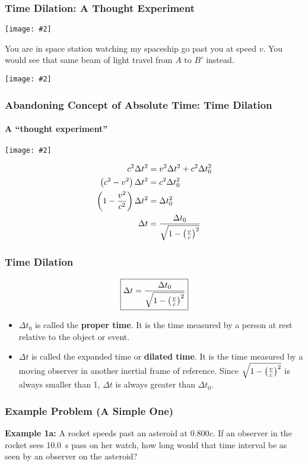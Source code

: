 \documentclass[12pt,compress,aspectratio=169]{beamer}
\newcommand{\pic}[2]{\texttt{[image: \#2]}}
\newcommand{\bigsqrt}{\ensuremath\sqrt{1-\left(\frac{v}{c}\right)^2}}
\begin{document}
\begin{frame}
  \frametitle{Time Dilation: A Thought Experiment}
  \begin{center}
    \pic{.7}{light-a-b-rocket.png}
  \end{center}
  You are in space station watching my spaceship go past you at speed $v$. You
  would see that same beam of light travel from $A$ to $B'$ instead.
  \begin{center}
    \pic{.7}{light-a-b-prime.png}
  \end{center}
\end{frame}

\begin{frame}
  \frametitle{Abandoning Concept of Absolute Time: Time Dilation}
  \framesubtitle{A ``thought experiment''}
  \begin{center}
    \pic{.7}{dilation.png}
  \end{center}
  \begin{align*}
    c^2\Delta t^2 &=v^2\Delta t^2 + c^2\Delta t_0^2\\
    \left(c^2-v^2\right)\Delta t^2 &=c^2\Delta t_0^2\\
    \left(1-\frac{v^2}{c^2}\right)\Delta t^2 &=\Delta t_0^2\\
    \Delta t &=\frac{\Delta t_0}{\bigsqrt}
  \end{align*}
\end{frame}


\begin{frame}
  \frametitle{Time Dilation}
  {\Large
    \begin{displaymath}
      \boxed{\Delta t =\frac{\Delta t_0}{\bigsqrt}}
    \end{displaymath}
  }
  \begin{itemize}
  \item $\Delta t_0$ is called the \textbf{proper time}. It is the time measured
    by a person at rest relative to the object or event.
  \item $\Delta t$ is called the expanded time or \textbf{dilated time}. It is 
    the time measured by a moving observer in another inertial frame of
    reference. Since $\bigsqrt$ is always smaller than 1, $\Delta t$ is always
    greater than $\Delta t_0$.
  \end{itemize}
\end{frame}

\begin{frame}
  \frametitle{Example Problem (A Simple One)}
  \textbf{Example 1a:} A rocket speeds past an asteroid at 0.800$c$. If an
  observer in the rocket sees \SI{10.0}{s} pass on her watch, how long would
  that time interval be as seen by an observer on the asteroid?


\end{frame}
\end{document}
